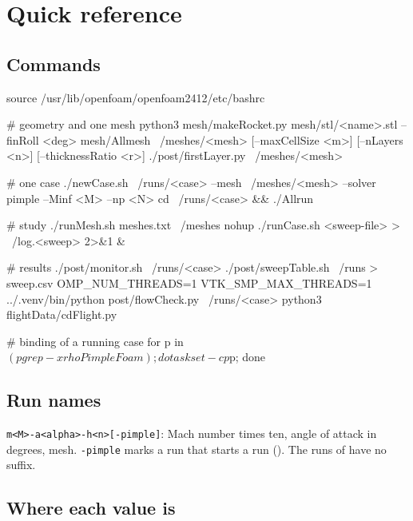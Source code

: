\chapter{Quick reference}\label{app:quickref}

\section{Commands}

\begin{shell}
source /usr/lib/openfoam/openfoam2412/etc/bashrc

# geometry and one mesh
python3 mesh/makeRocket.py mesh/stl/<name>.stl --finRoll <deg>
mesh/Allmesh ~/meshes/<mesh> [--maxCellSize <m>] [--nLayers <n>] [--thicknessRatio <r>]
./post/firstLayer.py ~/meshes/<mesh>

# one case
./newCase.sh ~/runs/<case> --mesh ~/meshes/<mesh> --solver pimple --Minf <M> --np <N>
cd ~/runs/<case> && ./Allrun

# study
./runMesh.sh meshes.txt ~/meshes
nohup ./runCase.sh <sweep-file> > ~/log.<sweep> 2>&1 &

# results
./post/monitor.sh ~/runs/<case>
./post/sweepTable.sh ~/runs > sweep.csv
OMP_NUM_THREADS=1 VTK_SMP_MAX_THREADS=1 ../.venv/bin/python post/flowCheck.py ~/runs/<case>
python3 flightData/cdFlight.py

# binding of a running case
for p in $(pgrep -x rhoPimpleFoam); do taskset -cp $p; done
\end{shell}

\section{Run names}

\texttt{m<M>-a<alpha>-h<n>[-pimple]}: Mach number times ten, angle of attack in
degrees, mesh. \texttt{-pimple} marks a  run that starts a
 run (). The runs of 
have no suffix.

\section{Where each value is}

